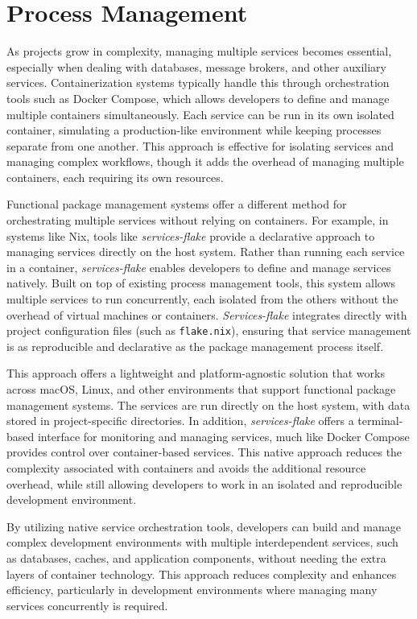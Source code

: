 \section{Process Management}
As projects grow in complexity, managing multiple services becomes essential, especially
when dealing with databases, message brokers, and other auxiliary services. Containerization
systems typically handle this through orchestration tools such as Docker Compose, which
allows developers to define and manage multiple containers simultaneously. Each service
can be run in its own isolated container, simulating a production-like environment while
keeping processes separate from one another. This approach is effective for isolating services
and managing complex workflows, though it adds the overhead of managing multiple containers,
each requiring its own resources.

Functional package management systems offer a different method for orchestrating multiple
services without relying on containers. For example, in systems like Nix, tools like
\textit{services-flake} provide a declarative approach to managing services directly on the
host system. Rather than running each service in a container, \textit{services-flake} enables
developers to define and manage services natively. Built on top of existing process management
tools, this system allows multiple services to run concurrently, each isolated from the others
without the overhead of virtual machines or containers. \textit{Services-flake} integrates
directly with project configuration files (such as \texttt{flake.nix}), ensuring that service
management is as reproducible and declarative as the package management process itself.

This approach offers a lightweight and platform-agnostic solution that works across macOS,
Linux, and other environments that support functional package management systems. The services
are run directly on the host system, with data stored in project-specific directories. In
addition, \textit{services-flake} offers a terminal-based interface for monitoring and managing
services, much like Docker Compose provides control over container-based services. This
native approach reduces the complexity associated with containers and avoids the additional
resource overhead, while still allowing developers to work in an isolated and reproducible
development environment.

By utilizing native service orchestration tools, developers can build and manage complex
development environments with multiple interdependent services, such as databases, caches,
and application components, without needing the extra layers of container technology. This
approach reduces complexity and enhances efficiency, particularly in development environments
where managing many services concurrently is required.

